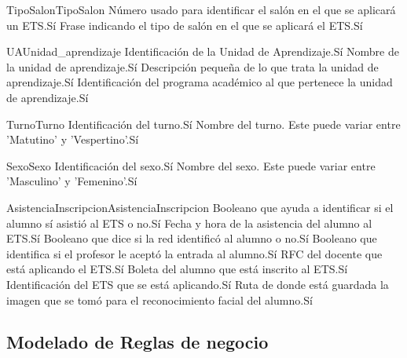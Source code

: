 \begin{cdtEntidad}{TipoSalon}{TipoSalon}
	{Número usado para identificar el salón en el que se aplicará un ETS.}{Sí}
	{Frase indicando el tipo de salón en el que se aplicará el ETS.}{Sí}
\end{cdtEntidad}
\begin{cdtEntidad}{UA}{Unidad\_aprendizaje}
	{Identificación de la Unidad de Aprendizaje.}{Sí}
	{Nombre de la unidad de aprendizaje.}{Sí}
	{Descripción pequeña de lo que trata la unidad de aprendizaje.}{Sí}
	{Identificación del programa académico al que pertenece la unidad de aprendizaje.}{Sí}
\end{cdtEntidad}
\begin{cdtEntidad}{Turno}{Turno}
	{Identificación del turno.}{Sí}
	{Nombre del turno. Este puede variar entre 'Matutino' y 'Vespertino'.}{Sí}
\end{cdtEntidad}
\begin{cdtEntidad}{Sexo}{Sexo}
	{Identificación del sexo.}{Sí}
	{Nombre del sexo. Este puede variar entre 'Masculino' y 'Femenino'.}{Sí}
\end{cdtEntidad}
\begin{cdtEntidad}{AsistenciaInscripcion}{AsistenciaInscripcion}
	{Booleano que ayuda a identificar si el alumno sí asistió al ETS o no.}{Sí}
	{Fecha y hora de la asistencia del alumno al ETS.}{Sí}
	{Booleano que dice si la red identificó al alumno o no.}{Sí}
	{Booleano que identifica si el profesor le aceptó la entrada al alumno.}{Sí}
	{RFC del docente que está aplicando el ETS.}{Sí}
	{Boleta del alumno que está inscrito al ETS.}{Sí}
	{Identificación del ETS que se está aplicando.}{Sí}
	{Ruta de donde está guardada la imagen que se tomó para el reconocimiento facial del alumno.}{Sí}
\end{cdtEntidad}
\subsection{Modelado de Reglas de negocio}




